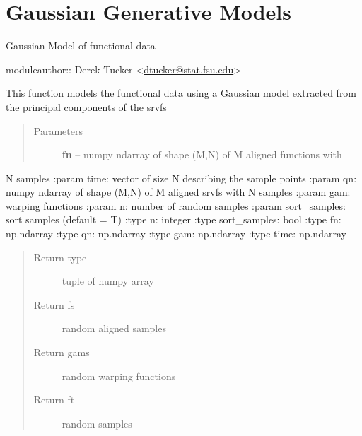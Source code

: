 \documentclass[letterpaper,10pt,english]{sphinxmanual}
\begin{document}
\chapter{Gaussian Generative Models}
\label{gauss_model:gaussian-generative-models}\label{gauss_model:module-gauss_model}\label{gauss_model::doc}
Gaussian Model of functional data

moduleauthor:: Derek Tucker \textless{}\href{mailto:dtucker@stat.fsu.edu}{dtucker@stat.fsu.edu}\textgreater{}

\begin{fulllineitems}
\label{gauss_model:gauss_model.gauss_model}
This function models the functional data using a Gaussian model
extracted from the principal components of the srvfs
\begin{quote}\begin{description}
\item[{Parameters}] \leavevmode
\textbf{fn} -- numpy ndarray of shape (M,N) of M aligned functions with

\end{description}\end{quote}

N samples
:param time: vector of size N describing the sample points
:param qn: numpy ndarray of shape (M,N) of M aligned srvfs with N samples
:param gam: warping functions
:param n: number of random samples
:param sort\_samples: sort samples (default = T)
:type n: integer
:type sort\_samples: bool
:type fn: np.ndarray
:type qn: np.ndarray
:type gam: np.ndarray
:type time: np.ndarray
\begin{quote}\begin{description}
\item[{Return type}] \leavevmode
tuple of numpy array

\item[{Return fs}] \leavevmode
random aligned samples

\item[{Return gams}] \leavevmode
random warping functions

\item[{Return ft}] \leavevmode
random samples

\end{description}\end{quote}

\end{fulllineitems}
\end{document}
